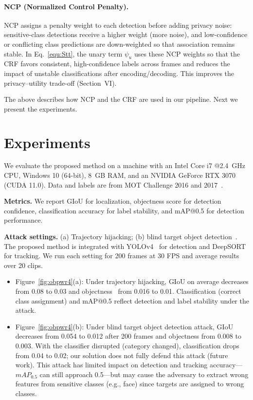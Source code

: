\documentclass[trans]{IEEEtran}
\begin{document}
\paragraph{NCP (Normalized Control Penalty).} NCP assigns a penalty weight to each detection before adding privacy noise: sensitive-class detections receive a higher weight (more noise), and low-confidence or conflicting class predictions are down-weighted so that association remains stable. In Eq.~\eqref{equ:Stt}, the unary term $\psi_u$ uses these NCP weights so that the CRF favors consistent, high-confidence labels across frames and reduces the impact of unstable classifications after encoding/decoding. This improves the privacy--utility trade-off (Section~VI).

The above describes how NCP and the CRF are used in our pipeline. Next we present the experiments.

\section{Experiments}

We evaluate the proposed method on a machine with an Intel Core i7 @2.4~GHz CPU, Windows 10 (64-bit), 8~GB RAM, and an NVIDIA GeForce RTX 3070 (CUDA 11.0). Data and labels are from MOT Challenge 2016 and 2017~\cite{milan2016mot16}. 

\textbf{Metrics.} We report GIoU for localization, objectness score for detection confidence, classification accuracy for label stability, and mAP@0.5 for detection performance.

\textbf{Attack settings.} (a) Trajectory hijacking; (b) blind target object detection~\cite{jia2020fooling}. The proposed method is integrated with YOLOv4~\cite{bochkovskiy2020yolov4} for detection and DeepSORT for tracking. We run each setting for 200 frames at 30 FPS and average results over 20 clips.

\begin{itemize}
    \item Figure~\ref{fig:obpwr4}(a): Under trajectory hijacking, GIoU on average decreases from 0.08 to 0.03 and objectness~\cite{alexe2012measuring} from 0.016 to 0.01. Classification (correct class assignment) and mAP@0.5 reflect detection and label stability under the attack.
    \item Figure~\ref{fig:obpwr4}(b): Under blind target object detection attack, GIoU decreases from 0.054 to 0.012 after 200 frames and objectness from 0.008 to 0.003. With the classifier disrupted (category changed), classification drops from 0.04 to 0.02; our solution does not fully defend this attack (future work). This attack has limited impact on detection and tracking accuracy---$mAP_{0.5}$ can still approach 0.5---but may cause the adversary to extract wrong features from sensitive classes (e.g., face) since targets are assigned to wrong classes.
\end{itemize}
\end{document}
